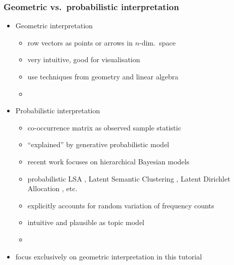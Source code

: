 \begin{frame}
  \frametitle{Geometric vs.\ probabilistic interpretation}

  \begin{itemize}
  \item Geometric interpretation
    \begin{itemize}
    \item row vectors as points or arrows in $n$-dim.\ space
    \item very intuitive, good for visualisation
    \item use techniques from geometry and linear algebra
    \item[]
    \end{itemize}
    \pause
  \item Probabilistic interpretation
    \begin{itemize}
    \item co-occurrence matrix as observed sample statistic
    \item ``explained'' by generative probabilistic model
    \item recent work focuses on hierarchical Bayesian models
    \item probabilistic LSA \citep{Hoffmann:99}, Latent Semantic
      Clustering \citep{Rooth:etc:99}, Latent Dirichlet Allocation
      \citep{Blei:Ng:Jordan:03}, etc.
    \item explicitly accounts for random variation of frequency counts
    \item intuitive and plausible as topic model
    \item[]
    \end{itemize}
    \pause
  \item[\hand] focus exclusively on geometric interpretation in this tutorial
  \end{itemize}
\end{frame}

